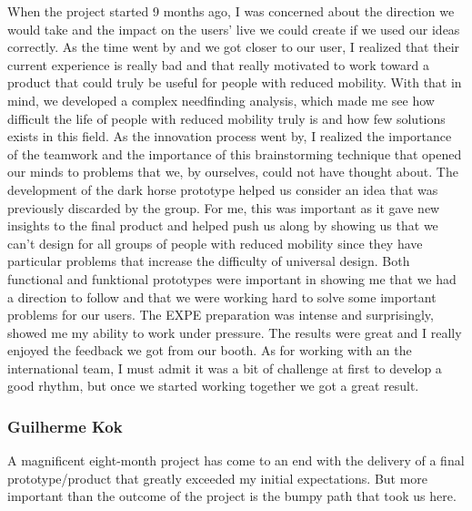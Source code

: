         	When the project started 9 months ago, I was concerned about the direction we would take and the impact on the users' live we could create if we used our ideas correctly. As the time went by and we got closer to our user, I realized that their current experience is really bad and that really motivated to work toward a product that could truly be useful for people with reduced mobility. With that in mind, we developed a complex needfinding analysis, which made me see how difficult the life of people with reduced mobility truly is and how few solutions exists in this field. As the innovation process went by, I realized the importance of the teamwork and the importance of this brainstorming technique that opened our minds to problems that we, by ourselves, could not have thought about. The development of the dark horse prototype helped us consider an idea that was previously discarded by the group. For me, this was important as it gave new insights to the final product and helped push us along by showing us that we can’t design for all groups of people with reduced mobility since they have particular problems that increase the difficulty of universal design. Both functional and funktional prototypes were important in showing me that we had a direction to follow and that we were working hard to solve some important problems for our users.  The EXPE preparation was intense and surprisingly, showed me my ability to work under pressure. The results were great and I really enjoyed the feedback we got from our booth. As for working with an the international team, I must admit it was a bit of challenge at first to develop a good rhythm, but once we started working together we got a great result.

\subsubsection{Guilherme Kok}
A magnificent eight-month project has come to an end with the delivery of a final prototype/product that greatly exceeded my initial expectations. But more important than the outcome of the project is the bumpy path that took us here.

